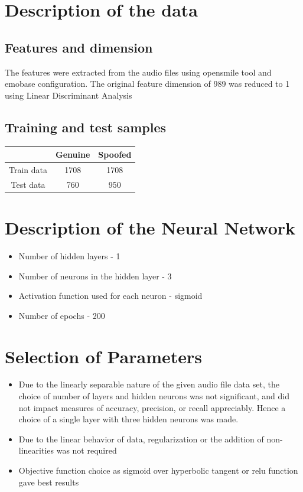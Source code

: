 \documentclass[12pt]{article}
\begin{document}
\begin{titlepage}
\vfill %

\end{titlepage}
\section{Description of the data}
\subsection{Features and dimension}
The features were extracted from the audio files  using opensmile tool and emobase configuration. The original feature dimension of 989 was reduced to 1 using Linear Discriminant Analysis
\subsection{Training and test samples}
\begin{center}
	\begin{tabular}{|c|c|c|}
		\hline 
			   & Genuine & Spoofed \\
			   \hline
		Train data & 1708    & 1708     \\
		\hline 
		Test data  & 760     & 950	 \\		
		\hline
	\end{tabular}
\end{center}
\section{Description of the Neural Network}
\begin{itemize}
	\item Number of hidden layers - 1
	\item Number of neurons in the hidden layer - 3
	\item Activation function used for each neuron - sigmoid
	\item Number of epochs - 200
\end{itemize}
\section{Selection of Parameters}
\begin{itemize}
	\item Due to the linearly separable nature of the given audio file data set, the  choice of number of layers and hidden neurons was not significant, and did not impact measures of accuracy, precision, or recall appreciably. Hence a choice of a single layer with three hidden neurons was made.
	\item Due to the linear behavior of data, regularization or the addition of non-linearities was not required
	\item Objective function choice as sigmoid over hyperbolic tangent or relu function gave best results
\end{itemize}	
\end{document}
